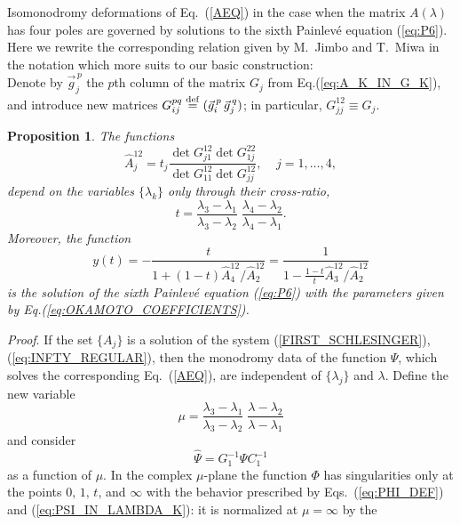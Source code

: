 \documentclass[11pt]{article}
\newtheorem{proposition}{Proposition}[section]
\def\l{\lambda}
\begin{document}
Isomonodromy deformations of Eq.~(\ref{AEQ}) in the case when the matrix
$A(\lambda)$ has four poles are governed by solutions to the sixth 
Painlev\'e equation (\ref{eq:P6}). 
Here we rewrite the corresponding relation 
given by M.~Jimbo and T.~Miwa \cite{JM} in the notation which more suits to 
our basic construction:\\
Denote by $\vec g_j^{\,p}$ the $p$th column of the matrix $G_j$ from 
Eq.(\ref{eq:A_K_IN_G_K}), 
and introduce new matrices
$G_{ij}^{pq}\stackrel{{\rm def}}{=}(\vec g_i^{\,p}\,\vec g_j^{\,q})$;
in particular, $G_{jj}^{12}\equiv G_j$.
\begin{proposition}\label{SCH_P6}
The functions
\begin{equation}
  \label{eq:B_J}
\hat A_j^{12}=t_j
\frac{\det G_{j1}^{12}\det G_{1j}^{22}}{\det G_{11}^{12}\det G_{jj}^{12}},\;\;
\;\;j=1,\dots,4,
\end{equation}
depend on the variables $\{\l_k\}$ only through their cross-ratio, 
\begin{equation}
  \label{eq:DEF_T}
t=\frac{\lambda_3-\lambda_1}{\lambda_3-\lambda_2}\;
\frac{\lambda_4-\lambda_2}{\lambda_4-\lambda_1}.  
\end{equation}
Moreover, the function
\begin{equation}
  \label{eq:DEF_SOLUTION}
  y(t)=-\frac t{1+(1-t)\hat A_4^{12}/\hat A_2^{12}}=
\frac 1{1-\frac{1-t}t\hat A_3^{12}/\hat A_2^{12}}
\end{equation}
is the solution of the sixth Painlev\'e equation (\ref{eq:P6}) with 
the parameters given by Eq.(\ref{eq:OKAMOTO_COEFFICIENTS}).

\end{proposition}
{\it Proof}. If the set $\{A_j\}$ is a solution of the system (\ref{FIRST_SCHLESINGER}), (\ref{eq:INFTY_REGULAR}), then the
monodromy data of the function $\Psi$, which solves the corresponding Eq.~(\ref{AEQ}), are independent of 
$\{\l_j\}$ and $\l$. Define the new variable
\begin{equation}
  \label{MU}
\mu=\frac{\lambda_3-\lambda_1}{\lambda_3-\lambda_2}\;
\frac{\lambda-\lambda_2}{\lambda-\lambda_1}
\end{equation}
and consider
\begin{equation}
  \label{eq:PHI_DEF}
\hat\Psi=G_1^{-1}\Psi C_1^{-1}
\end{equation}
as a function of $\mu$. In the complex $\mu$-plane the function $\Phi$
has singularities only at the points $0,\,1,\,t$, and $\infty$ 
with the behavior prescribed by Eqs.~(\ref{eq:PHI_DEF}) and (\ref{eq:PSI_IN_LAMBDA_K}): it is normalized at $\mu=\infty$ by the
\end{document}
